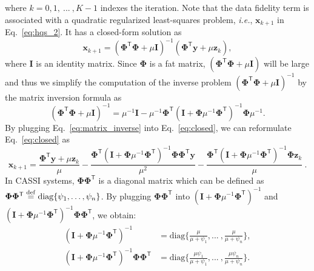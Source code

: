 \documentclass{article}
\newcommand{\tsp}{^{\mathsf{T}}}
\begin{document}
where $k = 0, 1,~...~, K-1$ indexes the iteration. Note that the data fidelity term  is associated with a quadratic regularized least-squares problem, \emph{i.e.}, $\mathbf{x}_{k+1}$ in Eq.~\eqref{eq:hqs_2}. It has a closed-form solution as 
\begin{equation}
	\mathbf{x}_{k+1} = (\mathbf{\Phi}\tsp \mathbf{\Phi} + \mu \mathbf{I})^{-1} (\mathbf{\Phi}\tsp \mathbf{y} + \mu \mathbf{z}_k),  
	\label{eq:closed}
\end{equation}
where $\mathbf{I}$ is an identity matrix. Since $\mathbf{\Phi}$ is a fat matrix, $(\mathbf{\Phi}\tsp \mathbf{\Phi} + \mu \mathbf{I})$ will be large and thus we simplify the computation of the inverse problem $(\mathbf{\Phi}\tsp \mathbf{\Phi} + \mu \mathbf{I})^{-1}$ by the matrix inversion formula as  
\begin{equation}
	(\mathbf{\Phi}\tsp \mathbf{\Phi} + \mu \mathbf{I})^{-1} = \mu^{-1} \mathbf{I} - \mu^{-1} \mathbf{\Phi}\tsp (\mathbf{I} + \mathbf{\Phi} \mu^{-1} \mathbf{\Phi}\tsp)^{-1} \mathbf{\Phi} \mu^{-1}.
	\label{eq:matrix_inverse}
\end{equation}
By plugging Eq.~\eqref{eq:matrix_inverse} into Eq.~\eqref{eq:closed}, we can reformulate Eq.~\eqref{eq:closed} as 
\begin{equation}
	\mathbf{x}_{k+1} = \frac{\mathbf{\Phi}\tsp \mathbf{y} + \mu \mathbf{z}_{k}}{\mu} - \frac{\mathbf{\Phi}\tsp (\mathbf{I} + \mathbf{\Phi} \mu^{-1} \mathbf{\Phi}\tsp)^{-1} \mathbf{\Phi} \mathbf{\Phi}\tsp \mathbf{y}}{\mu^2}  - \frac{\mathbf{\Phi}\tsp (\mathbf{I} + \mathbf{\Phi} \mu^{-1} \mathbf{\Phi}\tsp)^{-1} \mathbf{\Phi} \mathbf{z}_{k}}{\mu} ~.
	\label{eq:7}
\end{equation}
In CASSI systems, $\mathbf{\Phi} \mathbf{\Phi}\tsp$ is a diagonal matrix which can be defined as 
$\mathbf{\Phi} \mathbf{\Phi}\tsp \stackrel{\rm def}{=} {\rm diag}\{\psi_1, \dots, \psi_n\}$. By plugging $\mathbf{\Phi} \mathbf{\Phi}\tsp$ into $(\mathbf{I} + \mathbf{\Phi} \mu^{-1} \mathbf{\Phi}\tsp)^{-1}$ and $(\mathbf{I} + \mathbf{\Phi} \mu^{-1} \mathbf{\Phi}\tsp)^{-1} \mathbf{\Phi} \mathbf{\Phi}\tsp$, we obtain: 
\begin{equation}
\begin{aligned}
	(\mathbf{I} + \mathbf{\Phi} \mu^{-1} \mathbf{\Phi}\tsp)^{-1} &= \text{diag}\Big\{\frac{\mu}{\mu+\psi_1}, ...~,\frac{\mu}{\mu+\psi_n}\Big\}, \\ (\mathbf{I} + \mathbf{\Phi} \mu^{-1} \mathbf{\Phi}\tsp)^{-1} \mathbf{\Phi} \mathbf{\Phi}\tsp &= \text{diag}\Big\{\frac{\mu\psi_1}{\mu+\psi_1}, ...~,\frac{\mu\psi_n}{\mu+\psi_n}\Big\}.
	\label{eq:8}
\end{aligned}
\end{equation}
\end{document}
